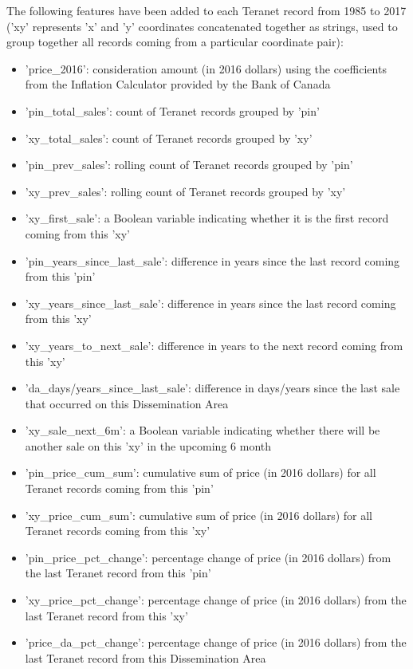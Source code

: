 The following features have been added to each Teranet record from 1985 to 2017 ('xy' represents 'x' and 'y' coordinates concatenated together as strings, used to group together all records coming from a particular coordinate pair):

\begin{itemize}
    \item 'price\_2016': consideration amount (in 2016 dollars) using the coefficients from the Inflation Calculator provided by the Bank of Canada\cite{BankofCanada2019}
    \item 'pin\_total\_sales': count of Teranet records grouped by 'pin'
    \item 'xy\_total\_sales': count of Teranet records grouped by 'xy'
    \item 'pin\_prev\_sales': rolling count of Teranet records grouped by 'pin'
    \item 'xy\_prev\_sales': rolling count of Teranet records grouped by 'xy'
    \item 'xy\_first\_sale': a Boolean variable indicating whether it is the first record coming from this 'xy'
    \item 'pin\_years\_since\_last\_sale': difference in years since the last record coming from this 'pin'
    \item 'xy\_years\_since\_last\_sale': difference in years since the last record coming from this 'xy'
    \item 'xy\_years\_to\_next\_sale': difference in years to the next record coming from this 'xy'
    \item 'da\_days/years\_since\_last\_sale': difference in days/years since the last sale that occurred on this Dissemination Area
    \item 'xy\_sale\_next\_6m': a Boolean variable indicating whether there will be another sale on this 'xy' in the upcoming 6 month
    \item 'pin\_price\_cum\_sum': cumulative sum of price (in 2016 dollars) for all Teranet records coming from this 'pin'
    \item 'xy\_price\_cum\_sum': cumulative sum of price (in 2016 dollars) for all Teranet records coming from this 'xy'
    \item 'pin\_price\_pct\_change': percentage change of price (in 2016 dollars) from the last Teranet record from this 'pin'
    \item 'xy\_price\_pct\_change': percentage change of price (in 2016 dollars) from the last Teranet record from this 'xy'
    \item 'price\_da\_pct\_change': percentage change of price (in 2016 dollars) from the last Teranet record from this Dissemination Area

\end{itemize}
